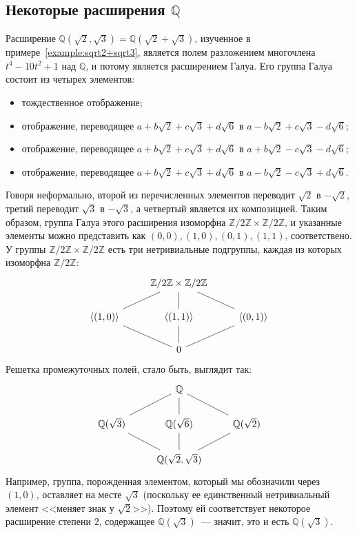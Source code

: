 \documentclass[a4paper,11pt]{scrartcl}
\theoremstyle{plain}
\theoremstyle{definition}
\newcommand\mb{\mathbb}
\newcommand\la{\langle}
\newcommand\ra{\rangle}
\begin{document}
\subsection{Некоторые расширения $\mb Q$}

Расширение $\mb Q(\sqrt{2},\sqrt{3}) = \mb Q(\sqrt{2} + \sqrt{3})$,
изученное в примере~\ref{example:sqrt2+sqrt3},
является полем разложением многочлена
$t^4 - 10t^2 + 1$ над $\mb Q$, и потому является расширением Галуа.
Его группа Галуа состоит из четырех элементов:
\begin{itemize}
\item тождественное отображение;
\item отображение, переводящее $a + b\sqrt{2} + c\sqrt{3} + d\sqrt{6}$
в $a - b\sqrt{2} + c\sqrt{3} - d\sqrt{6}$;
\item отображение, переводящее $a + b\sqrt{2} + c\sqrt{3} + d\sqrt{6}$
в $a + b\sqrt{2} - c\sqrt{3} - d\sqrt{6}$;
\item отображение, переводящее $a + b\sqrt{2} + c\sqrt{3} + d\sqrt{6}$
в $a - b\sqrt{2} - c\sqrt{3} + d\sqrt{6}$.
\end{itemize}
Говоря неформально, второй из перечисленных элементов переводит
$\sqrt{2}$ в $-\sqrt{2}$, третий переводит $\sqrt{3}$ в $-\sqrt{3}$,
а четвертый является их композицией.
Таким образом, группа Галуа этого расширения изоморфна
$\mb Z/2\mb Z \times \mb Z/2\mb Z$,
и указанные элементы можно представить как
$(0,0), (1,0), (0,1), (1,1)$, соответствено.
У группы $\mb Z/2\mb Z\times \mb Z/2\mb Z$ есть три нетривиальные
подгруппы, каждая из которых изоморфна $\mb Z/2\mb Z$:
$$
\begin{tikzcd}
 & \mb Z/2\mb Z \times \mb Z/2\mb Z
 \arrow[dash]{dl}\arrow[dash]{d}\arrow[dash]{dr}
  & \\
\la (1,0)\ra & \la (1,1)\ra & \la (0,1)\ra\\
 & 0\arrow[dash]{ul}\arrow[dash]{u}\arrow[dash]{ur} &
\end{tikzcd}
$$
Решетка промежуточных полей, стало быть, выглядит так:
$$
\begin{tikzcd}
 & \mb Q
 \arrow[dash]{dl}\arrow[dash]{d}\arrow[dash]{dr}
  & \\
\mb Q(\sqrt{3}) & \mb Q(\sqrt{6}) & \mb Q(\sqrt{2})\\
 & \mb Q(\sqrt{2},\sqrt{3})
\arrow[dash]{ul}\arrow[dash]{u}\arrow[dash]{ur} &
\end{tikzcd}
$$
Например, группа, порожденная элементом, который мы обозначили через
$(1,0)$, оставляет на месте $\sqrt{3}$ (поскольку ее единственный
нетривиальный элемент <<меняет знак у $\sqrt{2}$>>).
Поэтому ей соответствует некоторое расширение степени $2$,
содержащее $\mb Q(\sqrt{3})$~--- значит, это и есть $\mb Q(\sqrt{3})$.
\end{document}
